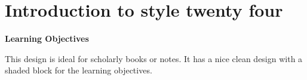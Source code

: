 \chapter{Introduction to style twenty four}

\def\objectives@{
\begin{tcolorbox}[width=\linewidth,boxsep=10pt,right=10pt]
\textbf{Learning Objectives}}
\def\stopobjectives@{\end{tcolorbox}}
\newenvironment{objectives}{\bigskip\objectives@}{\stopobjectives@\bigskip}

\begin{objectives}
\par
\lipsum[1]
\bigskip\bigskip
\end{objectives}

This design is ideal for scholarly books or notes. It has a nice clean design with a shaded block for the learning objectives.
\medskip
\begin{figure}[ht]
\centering
{}
\end{figure}
\lipsum[2-3]




